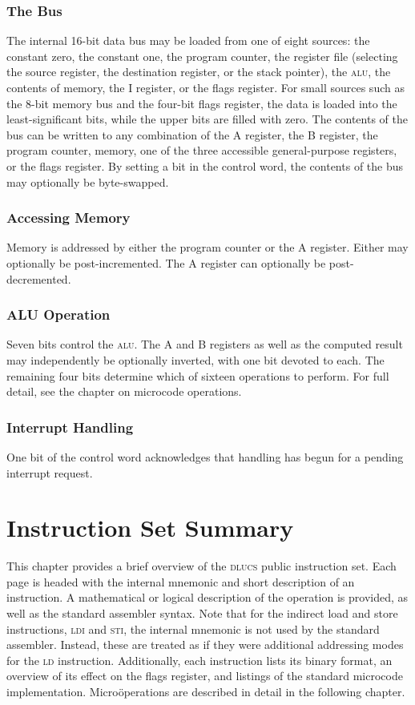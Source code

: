 \documentclass[11pt]{book}
\begin{document}
\subsection{The Bus}
The internal 16-bit data bus may be loaded from one of eight sources:
the constant zero,
the constant one,
the program counter,
the register file
(selecting the source register,
 the destination register,
 or the stack pointer),
the \textsc{alu},
the contents of memory,
the I register, or
the flags register.
For small sources such as the 8-bit memory bus
and the four-bit flags register,
the data is loaded into the least-significant bits,
while the upper bits are filled with zero.
The contents of the bus can be written to any combination of
the A register,
the B register,
the program counter,
memory,
one of the three accessible general-purpose registers,
or the flags register.
By setting a bit in the control word,
the contents of the bus may optionally be byte-swapped.

\subsection{Accessing Memory}
Memory is addressed by either the program counter or the A register.
Either may optionally be post-incremented.
The A register can optionally be post-decremented.

\subsection{ALU Operation}
Seven bits control the \textsc{alu}.
The A and B registers as well as the computed result
may independently be optionally inverted,
with one bit devoted to each.
The remaining four bits determine
which of sixteen operations to perform.
For full detail, see the chapter on microcode operations.

\subsection{Interrupt Handling}
One bit of the control word acknowledges
that handling has begun for a pending interrupt request.


\chapter{Instruction Set Summary}
This chapter provides a brief overview
of the \textsc{dlucs} public instruction set.
Each page is headed with the internal mnemonic and short description
of an instruction.
A mathematical or logical description of the operation is provided,
as well as the standard assembler syntax.
Note that for the indirect load and store instructions,
\textsc{ldi} and \textsc{sti},
the internal mnemonic is not used by the standard assembler.
Instead, these are treated as if they were additional addressing modes
for the \textsc{ld} instruction.
Additionally, each instruction lists its binary format,
an overview of its effect on the flags register,
and listings of the standard microcode implementation.
Micro\"operations are described in detail in the following chapter.
\end{document}
